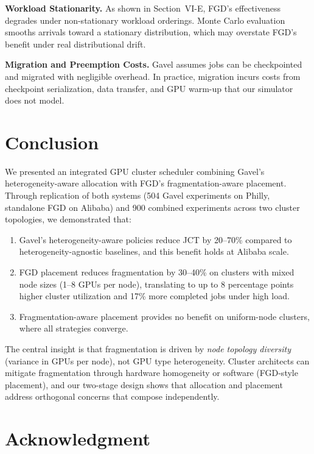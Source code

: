 \documentclass[conference]{IEEEtran}
\begin{document}
\textbf{Workload Stationarity.}
As shown in Section~VI-E, FGD's effectiveness degrades under non-stationary workload orderings.
Monte Carlo evaluation smooths arrivals toward a stationary distribution, which may overstate FGD's benefit under real distributional drift.

\textbf{Migration and Preemption Costs.}
Gavel assumes jobs can be checkpointed and migrated with negligible overhead.
In practice, migration incurs costs from checkpoint serialization, data transfer, and GPU warm-up that our simulator does not model.



\section{Conclusion}

We presented an integrated GPU cluster scheduler combining Gavel's heterogeneity-aware allocation with FGD's fragmentation-aware placement.
Through replication of both systems (504 Gavel experiments on Philly, standalone FGD on Alibaba) and 900 combined experiments across two cluster topologies, we demonstrated that:

\begin{enumerate}
\item Gavel's heterogeneity-aware policies reduce JCT by 20--70\% compared to heterogeneity-agnostic baselines, and this benefit holds at Alibaba scale.
\item FGD placement reduces fragmentation by 30--40\% on clusters with mixed node sizes (1--8 GPUs per node), translating to up to 8 percentage points higher cluster utilization and 17\% more completed jobs under high load.
\item Fragmentation-aware placement provides no benefit on uniform-node clusters, where all strategies converge.
\end{enumerate}

The central insight is that fragmentation is driven by \textit{node topology diversity} (variance in GPUs per node), not GPU type heterogeneity.
Cluster architects can mitigate fragmentation through hardware homogeneity or software (FGD-style placement), and our two-stage design shows that allocation and placement address orthogonal concerns that compose independently.


\section*{Acknowledgment}
\end{document}

